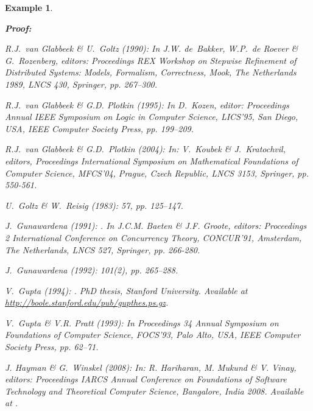 \documentclass[twocolumn]{article}
\newtheorem{exam}{Example}
\newenvironment{example}[1]{\begin{exam} \rm \label{ex-#1} }{\end{exam}}
\newenvironment{proof}{\begin{trivlist} \item[\hspace{\labelsep}\bf
Proof:]}{\hfill \end{trivlist}}
\begin{document}
\begin{example}{causality}
\begin{proof}
\begin{thebibliography}{10}
{\sc R.J.~van Glabbeek \& U.~Goltz} (1990):
\newblock In J.W. de~Bakker, W.P.~de Roever \& G.~Rozenberg, editors:
{Proceedings REX Workshop on \sl Stepwise Refinement of Distributed
Systems: Models, Formalism, Correctness, {\rm Mook, The Netherlands 1989}},
{\sl \rm LNCS} 430, Springer, pp. 267--300.

{\sc R.J.~van Glabbeek \& G.D. Plotkin} (1995):
\newblock In D.~Kozen, editor: {\sl {\rm Proceedings  Annual IEEE Symposium on} Logic in Computer Science, {\rm LICS'95, San Diego, USA}}, IEEE Computer Society Press, pp. 199--209.

{\sc R.J.~van Glabbeek \& G.D.~Plotkin} (2004):
\newblock In: V.~Koubek \& J.~Kratochvil, editors, {\sl {\rm Proceedings
   International Symposium on} Mathematical Foundations of Computer
  Science, {\rm MFCS'04, Prague, Czech Republic}}, LNCS 3153,
  Springer, pp. 550-561.

{\sc U.~Goltz \& W.~Reisig} (1983):
 57, pp. 125--147.

{\sc J.~Gunawardena} (1991):
.
\newblock In J.C.M. Baeten \& J.F. Groote, editors: Proceedings 2 International Conference on {\sl Concurrency Theory},
  CONCUR'91, Amsterdam, The Netherlands, LNCS 527, Springer, pp. 266-280.

{\sc J.~Gunawardena} (1992):
 101(2), pp. 265--288.

{\sc V.~Gupta} (1994):
.
\newblock PhD thesis, Stanford University.
\newblock Available at \url{http://boole.stanford.edu/pub/gupthes.ps.gz}.

{\sc V.~Gupta \& V.R. Pratt} (1993):
\newblock In {Proceedings 34 Annual Symposium on \sl
Foundations of Computer Science\rm, FOCS'93, Palo Alto, USA}, IEEE
Computer Society Press, pp. 62--71.

{\sc J. Hayman \& G.~Winskel} (2008):
\newblock In: R. Hariharan, M. Mukund \& V. Vinay, editors:
 Proceedings IARCS Annual Conference on
 {\sl Foundations of Software Technology and Theoretical Computer
Science}, Bangalore, India 2008.
\newblock Available at .


\end{thebibliography}
\end{proof}
\end{example}
\end{document}
